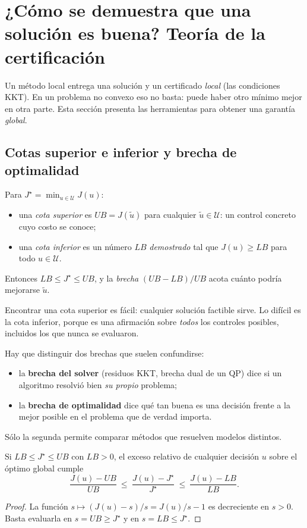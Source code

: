 \section{¿Cómo se demuestra que una solución es buena? Teoría de la certificación}\label{sec:certteoria}
Un método local entrega una solución y un certificado \emph{local} (las condiciones KKT). En un
problema no convexo eso no basta: puede haber otro mínimo mejor en otra parte. Esta sección
presenta las herramientas para obtener una garantía \emph{global}.

\subsection{Cotas superior e inferior y brecha de optimalidad}
\begin{definicion}
Para $J^\star=\min_{u\in\mathcal U}J(u)$:
\begin{itemize}
  \item una \emph{cota superior} es $UB=J(\tilde u)$ para cualquier $\tilde u\in\mathcal U$: un
        control concreto cuyo costo se conoce;
  \item una \emph{cota inferior} es un número $LB$ \emph{demostrado} tal que $J(u)\ge LB$ para
        todo $u\in\mathcal U$.
\end{itemize}
Entonces $LB\le J^\star\le UB$, y la \emph{brecha} $(UB-LB)/UB$ acota cuánto podría mejorarse
$\tilde u$.
\end{definicion}
\noindent Encontrar una cota superior es fácil: cualquier solución factible sirve. Lo difícil es
la cota inferior, porque es una afirmación sobre \emph{todos} los controles posibles, incluidos
los que nunca se evaluaron.

Hay que distinguir dos brechas que suelen confundirse:
\begin{itemize}
  \item la \textbf{brecha del solver} (residuos KKT, brecha dual de un QP) dice si un algoritmo
        resolvió bien \emph{su propio} problema;
  \item la \textbf{brecha de optimalidad} dice qué tan buena es una decisión frente a la mejor
        posible en el problema que de verdad importa.
\end{itemize}
Sólo la segunda permite comparar métodos que resuelven modelos distintos.

\begin{proposicion}\label{prop:exceso}
Si $LB\le J^\star\le UB$ con $LB>0$, el exceso relativo de cualquier decisión $u$ sobre el
óptimo global cumple
\[
\frac{J(u)-UB}{UB}\ \le\ \frac{J(u)-J^\star}{J^\star}\ \le\ \frac{J(u)-LB}{LB}.
\]
\end{proposicion}
\begin{proof}
La función $s\mapsto(J(u)-s)/s=J(u)/s-1$ es decreciente en $s>0$. Basta evaluarla en $s=UB\ge
J^\star$ y en $s=LB\le J^\star$.
\end{proof}


